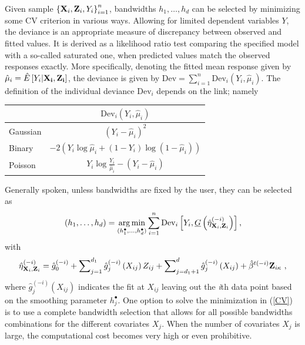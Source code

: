 Given sample $\left \{ {\bf X}_i, {\mathbf Z}_i, Y_i \right\}_{i=1}^n$, bandwidths $h_1,\ldots,h_d$ can be selected by minimizing some CV criterion in various ways. Allowing for limited dependent variables $Y$, the deviance is an appropriate measure of discrepancy between observed and fitted values. It is derived as a likelihood ratio test comparing the specified model with a so-called saturated one, when predicted values match the observed responses exactly. More specifically, denoting the fitted mean response given by $\hat \mu_i=\hat E \left[ {Y_i \vert {\bf X_i},{\bf Z_i}} \right]$, the deviance is given by $\mbox{Dev}= \sum_{i=1}^n \mbox{Dev}_i (Y_i, \hat \mu_i)$. The definition of the individual deviance $\mbox{Dev}_i$ depends on the link; namely
\begin{center}
\begin{tabular} {lc}
     & $\mbox{Dev}_i (Y_i, \hat \mu_i)$ \\
\hline
Gaussian &  $ \left({ Y_i- \hat \mu_i}\right)^2$ \\
Binary   &  $-2 \left({Y_i \log  \hat \mu_i +(1-Y_i) \log (1-\hat \mu_i)}\right)$\\
Poisson  &  $Y_i \log \frac{Y_i}{\hat \mu_i} -(Y_i-\hat \mu_i) $\\\hline
\end{tabular}
\end{center}

Generally spoken, unless bandwidths are fixed by the user, they can be selected as 
\begin{equation}
(h_1,\ldots,h_d)=
\underset{(h_1^\bullet,\ldots,h_d^\bullet)} {\operatorname{arg\min} }  
\sum_{i=1}^n \mbox{Dev}_i \left [ {Y_i, \underline{G} \left({
\hat \eta ^{(-i)}_{{\bf X}_i,{\bf Z}_i}
 }\right)}\right],
\label{CV}
\end{equation}
with
\begin{equation}
\hat \eta ^{(-i)}_{{\bf X}_i,{\bf Z}_i} = \hat{g}_0^{(-i)} + \sum\nolimits_{j = 1}^{d_1} \hat{g}_j ^{(-i)} \left( X_{ij} \right) Z_{ij} + \sum\nolimits_{j = d_1+1}^{d} \hat{g}_j^{(-i)}  \left( X_{ij} \right) + \hat{\beta}^{t(-i)} {\mathbf Z}_{i\kappa} \ ,
\label{add_predictor}
\end{equation}
where $\hat{g}_j ^{(-i)}(X_{ij})$ indicates the fit at $X_{ij}$ leaving out the \textit{i}th data point based on the smoothing parameter $h_j^\bullet$. One option to solve the minimization in (\ref{CV}) is to use a complete bandwidth selection that allows for all possible bandwidths combinations for the different covariates $X_j$. When the number of covariates $X_j$ is large, the computational cost becomes very high or even prohibitive. 


